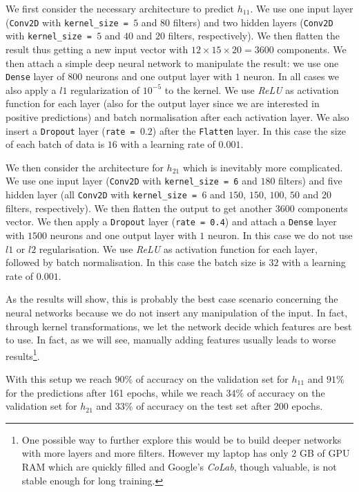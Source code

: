         We first consider the necessary architecture to predict $h_{11}$. We use one input layer (\texttt{Conv2D} with \texttt{kernel\_size = $5$} and $80$ filters) and two hidden layers (\texttt{Conv2D} with \texttt{kernel\_size = $5$} and $40$ and $20$ filters, respectively). We then flatten the result thus getting a new input vector with $12 \times 15 \times 20 = 3600$ components. We then attach a simple deep neural network to manipulate the result: we use one \texttt{Dense} layer of $800$ neurons and one output layer with $1$ neuron. In all cases we also apply a $l1$ regularization of $10^{-5}$ to the kernel. We use \textit{ReLU} as activation function for each layer (also for the output layer since we are interested in positive predictions) and batch normalisation after each activation layer. We also insert a \texttt{Dropout} layer (\texttt{rate = $0.2$}) after the \texttt{Flatten} layer. In this case the size of each batch of data is $16$ with a learning rate of $0.001$.
        
        We then consider the architecture for $h_{21}$ which is inevitably more complicated. We use one input layer (\texttt{Conv2D} with \texttt{kernel\_size = 6} and $180$ filters) and five hidden layer (all \texttt{Conv2D} with \texttt{kernel\_size = $6$} and $150$, $150$, $100$, $50$ and $20$ filters, respectively). We then flatten the output to get another $3600$ components vector. We then apply a \texttt{Dropout} layer (\texttt{rate = 0.4}) and attach a \texttt{Dense} layer with $1500$ neurons and one output layer with $1$ neuron. In this case we do not use $l1$ or $l2$ regularisation. We use \textit{ReLU} as activation function for each layer, followed by batch normalisation. In this case the batch size is $32$ with a learning rate of $0.001$.
        
        As the results will show, this is probably the best case scenario concerning the neural networks because we do not insert any manipulation of the input. In fact, through kernel transformations, we let the network decide which features are best to use. In fact, as we will see, manually adding features usually leads to worse results\footnote{One possible way to further explore this would be to build deeper networks with more layers and more filters. However my laptop has only 2 GB of GPU RAM which are quickly filled and Google's \textit{CoLab}, though valuable, is not stable enough for long training.}.
        
        With this setup we reach $90\%$ of accuracy on the validation set for $h_{11}$ and $91\%$ for the predictions after 161 epochs, while we reach $34\%$ of accuracy on the validation set for $h_{21}$ and $33\%$ of accuracy on the test set after 200 epochs.
    

